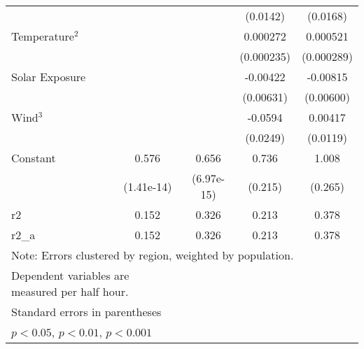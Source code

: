 \begin{table}[!htbp]
\begin{tabular}{l*{4}{c}}
                    &                     &                     &    (0.0142)         &    (0.0168)         \\
[1em]
Temperature$^2$ &                     &                     &    0.000272         &    0.000521         \\
                    &                     &                     &  (0.000235)         &  (0.000289)         \\
[1em]
Solar Exposure &                     &                     &    -0.00422         &    -0.00815         \\
                    &                     &                     &   (0.00631)         &   (0.00600)         \\
[1em]
Wind$^3$ &                     &                     &     -0.0594         &     0.00417         \\
                    &                     &                     &    (0.0249)         &    (0.0119)         \\
[1em]
Constant            &       0.576\sym{***}&       0.656\sym{***}&       0.736\sym{*}  &       1.008\sym{*}  \\
                    &  (1.41e-14)         &  (6.97e-15)         &     (0.215)         &     (0.265)         \\
\hline
r2                  &       0.152         &       0.326         &       0.213         &       0.378         \\
r2\_a                &       0.152         &       0.326         &       0.213         &       0.378         \\
\hline\hline
\multicolumn{5}{l}{Note: Errors clustered by region, weighted by population.} \\
\multicolumn{2}{l}{Dependent variables are measured per half hour.} \\
\multicolumn{5}{l}{\footnotesize Standard errors in parentheses}\\
\multicolumn{5}{l}{\footnotesize \sym{*} \(p<0.05\), \sym{**} \(p<0.01\), \sym{***} \(p<0.001\)}\\
\end{tabular}
\end{table}
